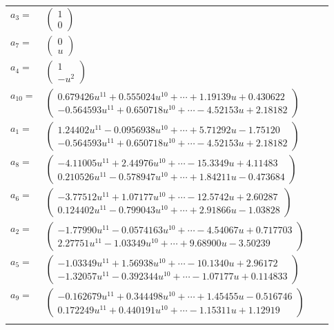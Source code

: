 \documentclass[1p]{elsarticle_modified}
\theoremstyle{definition}
\begin{document}
\begin{tabular}{m{7pt} m{180pt} m{7pt} m{180pt} }
\flushright $a_{3}=$&$\begin{pmatrix}1\\0\end{pmatrix}$ \\
\flushright $a_{7}=$&$\begin{pmatrix}0\\u\end{pmatrix}$ \\
\flushright $a_{4}=$&$\begin{pmatrix}1\\- u^2\end{pmatrix}$ \\
\flushright $a_{10}=$&$\begin{pmatrix}0.679426 u^{11}+0.555024 u^{10}+\cdots+1.19139 u+0.430622\\-0.564593 u^{11}+0.650718 u^{10}+\cdots-4.52153 u+2.18182\end{pmatrix}$ \\
\flushright $a_{1}=$&$\begin{pmatrix}1.24402 u^{11}-0.0956938 u^{10}+\cdots+5.71292 u-1.75120\\-0.564593 u^{11}+0.650718 u^{10}+\cdots-4.52153 u+2.18182\end{pmatrix}$ \\
\flushright $a_{8}=$&$\begin{pmatrix}-4.11005 u^{11}+2.44976 u^{10}+\cdots-15.3349 u+4.11483\\0.210526 u^{11}-0.578947 u^{10}+\cdots+1.84211 u-0.473684\end{pmatrix}$ \\
\flushright $a_{6}=$&$\begin{pmatrix}-3.77512 u^{11}+1.07177 u^{10}+\cdots-12.5742 u+2.60287\\0.124402 u^{11}-0.799043 u^{10}+\cdots+2.91866 u-1.03828\end{pmatrix}$ \\
\flushright $a_{2}=$&$\begin{pmatrix}-1.77990 u^{11}-0.0574163 u^{10}+\cdots-4.54067 u+0.717703\\2.27751 u^{11}-1.03349 u^{10}+\cdots+9.68900 u-3.50239\end{pmatrix}$ \\
\flushright $a_{5}=$&$\begin{pmatrix}-1.03349 u^{11}+1.56938 u^{10}+\cdots-10.1340 u+2.96172\\-1.32057 u^{11}-0.392344 u^{10}+\cdots-1.07177 u+0.114833\end{pmatrix}$ \\
\flushright $a_{9}=$&$\begin{pmatrix}-0.162679 u^{11}+0.344498 u^{10}+\cdots+1.45455 u-0.516746\\0.172249 u^{11}+0.440191 u^{10}+\cdots-1.15311 u+1.12919\end{pmatrix}$\\&\end{tabular}
\end{document}
